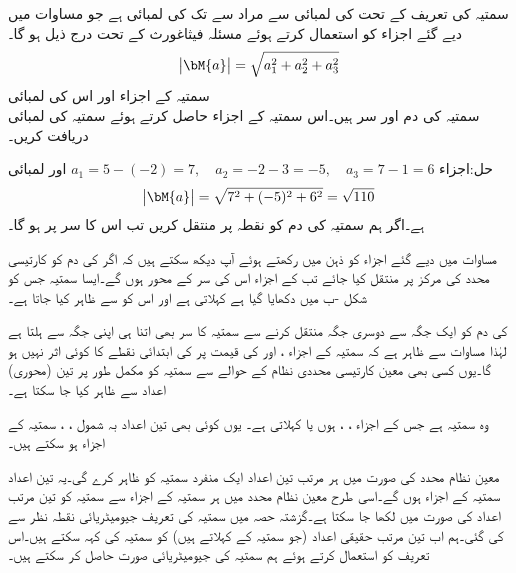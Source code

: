 سمتیہ کی تعریف کے تحت  کی لمبائی سے مراد  سے  تک کی لمبائی  ہے جو مساوات  میں دیے گئے اجزاء کو استعمال کرتے ہوئے مسئلہ فیثاغورث کے تحت درج ذیل ہو گا۔
\begin{align}
\abs{\bM{a}}=\sqrt{a_1^2+a_2^2+a_3^2}
\end{align} 
\quad سمتیہ کے اجزاء اور اس کی لمبائی\\
سمتیہ  کی دم  اور سر  ہیں۔اس سمتیہ کے اجزاء حاصل کرتے ہوئے سمتیہ کی لمبائی دریافت کریں۔

حل:اجزاء 
$a_1=5-(-2)=7,\quad a_2=-2-3=-5,\quad a_3=7-1=6$
اور لمبائی
\begin{align*}
\abs{\bM{a}}=\sqrt{7^2+(-5)^2+6^2}=\sqrt{110}
\end{align*}
ہے۔اگر ہم سمتیہ  کی دم کو نقطہ  پر منتقل کریں تب اس کا سر  پر ہو گا۔

مساوات  میں دیے گئے اجزاء کو ذہن میں رکھتے ہوئے آپ دیکھ سکتے ہیں کہ اگر  کی دم کو کارتیسی محدد کی مرکز پر منتقل کیا جائے تب  کے اجزاء اس کی سر کے محور ہوں گے۔ایسا سمتیہ جس کو شکل -ب میں دکھایا گیا ہے   کہلاتی ہے اور اس کو  سے ظاہر کیا جاتا ہے۔ 

 کی دم کو ایک جگہ سے دوسری جگہ منتقل کرنے سے سمتیہ کا سر بھی اتنا ہی اپنی جگہ سے ہلتا ہے لہٰذا مساوات  سے ظاہر ہے کہ سمتیہ  کے اجزاء ،  اور  کی قیمت پر  کی ابتدائی نقطے کا کوئی اثر نہیں ہو گا۔یوں کسی بھی معین کارتیسی محددی نظام کے حوالے سے سمتیہ کو مکمل طور پر تین (محوری) اعداد سے ظاہر کیا جا سکتا ہے۔

 وہ سمتیہ ہے جس کے اجزاء ، ،  ہوں  یا   کہلاتی ہے۔ یوں کوئی بھی تین اعداد بہ شمول  ، ،  سمتیہ کے اجزاء ہو سکتے ہیں۔

معین نظام محدد کی صورت میں  ہر مرتب تین اعداد ایک منفرد سمتیہ کو ظاہر کرے گی۔یہ تین اعداد سمتیہ کے اجزاء ہوں گے۔اسی طرح معین نظام محدد میں ہر سمتیہ کے اجزاء سے سمتیہ کو تین مرتب اعداد کی صورت میں لکھا جا سکتا ہے۔گزشتہ حصہ میں سمتیہ کی تعریف جیومیٹریائی نقطہ نظر سے کی گئی۔ہم اب تین مرتب حقیقی اعداد (جو سمتیہ کے  کہلاتے ہیں) کو سمتیہ کی  کہہ سکتے ہیں۔اس تعریف کو  استعمال کرتے ہوئے ہم سمتیہ کی جیومیٹریائی صورت حاصل کر سکتے ہیں۔  

